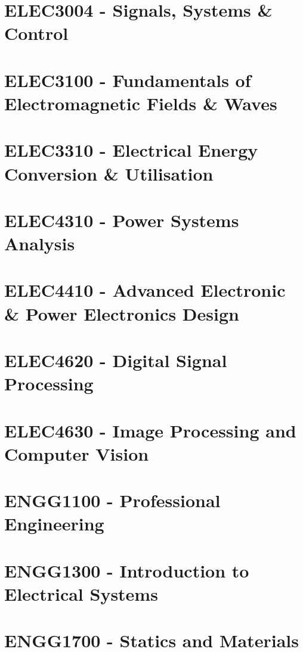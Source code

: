 \documentclass[a4paper,12pt]{report}
\begin{document}
\hypertarget{ELEC3004}{\section{ELEC3004 - Signals, Systems \& Control}}

\hypertarget{ELEC3100}{\section{ELEC3100 - Fundamentals of Electromagnetic Fields \& Waves}}

\hypertarget{ELEC3310}{\section{ELEC3310 - Electrical Energy Conversion \& Utilisation}}

\hypertarget{ELEC4310}{\section{ELEC4310 - Power Systems Analysis}}

\hypertarget{ELEC4410}{\section{ELEC4410 - Advanced Electronic \& Power Electronics Design}}

\hypertarget{ELEC4620}{\section{ELEC4620 - Digital Signal Processing}}

\hypertarget{ELEC4630}{\section{ELEC4630 - Image Processing and Computer Vision}}

\hypertarget{ENGG1100}{\section{ENGG1100 - Professional Engineering}}

\hypertarget{ENGG1300}{\section{ENGG1300 - Introduction to Electrical Systems}}

\hypertarget{ENGG1700}{\section{ENGG1700 - Statics and Materials}}
\end{document}

